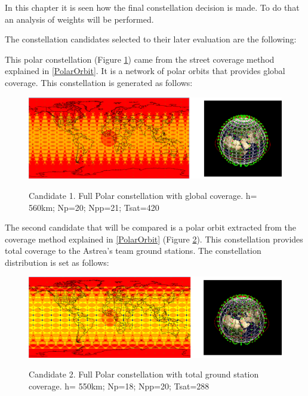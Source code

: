 In this chapter it is seen how the final constellation decision is made. To do that an analysis of weights will be performed.

The constellation candidates selected to their later evaluation are the following:

This polar constellation (Figure \ref{fig:Candidate1}) came from the street coverage method explained in \ref{PolarOrbit}. It is a network of polar orbits that provides global coverage. This constellation is generated as follows:

\begin{figure}[h] %
	\centering
	\includegraphics[width=1\textwidth]{Candidate1.png}\\
	\caption{Candidate 1. Full Polar constellation with global coverage.
			 h= 560km; Np=20; Npp=21; Tsat=420 }
	\label{fig:Candidate1}
\end{figure}

The second candidate that will be compared is a polar orbit extracted from the coverage method explained in \ref{PolarOrbit} (Figure \ref{fig:Candidate2}). This constellation provides total coverage to the Astrea's team ground stations. The constellation distribution is set as follows:

\begin{figure}[h]%
	\centering
	\includegraphics[width=1\textwidth]{Candidate2.png}\\
	\caption{Candidate 2. Full Polar constellation with total ground station coverage.
			 h= 550km; Np=18; Npp=20; Tsat=288 }
	\label{fig:Candidate2}
\end{figure}

